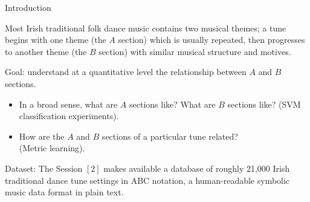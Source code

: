 \documentclass[letterpaper]{amsart}
\begin{document}
\begin{center}
\Huge
Introduction
\end{center}
\huge

Most Irish traditional folk dance music contains two musical themes; a tune
begins with one theme (the $A$ section) which is usually repeated, then
progresses to another theme (the $B$ section) with similar musical structure
and motives.

Goal: understand at a quantitative level the relationship between $A$ and $B$
sections.
\begin{itemize}
\item In a broad sense, what are $A$ sections like? What are $B$ sections like?
(SVM classification experiments).

\item How are the $A$ and $B$ sections of a particular tune related? \\(Metric
learning).
\end{itemize}

Dataset: The Session $[2]$ makes available a database of roughly 21,000 Irish
traditional dance tune settings in ABC notation, a human-readable symbolic
music data format in plain text.
\end{document}
